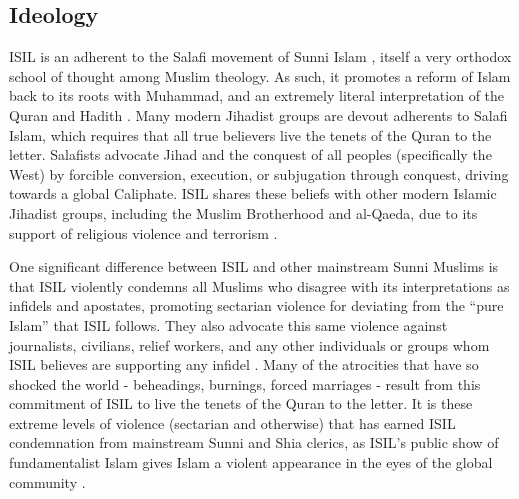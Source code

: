\documentclass{report}
\begin{document}
    


    \subsection{Ideology}
    
    ISIL is an adherent to the Salafi movement of Sunni Islam \cite{Bradley2015}, itself a very orthodox school of thought among Muslim theology.  As such, it promotes a reform of Islam back to its roots with Muhammad, and an extremely literal interpretation of the Quran and Hadith \cite{Hassan2015}. Many modern Jihadist groups are devout adherents to Salafi Islam, which requires that all true believers live the tenets of the Quran to the letter. Salafists  advocate Jihad and the conquest of all peoples (specifically the West) by forcible conversion, execution, or subjugation through conquest, driving towards a global Caliphate. ISIL shares these beliefs with other modern Islamic Jihadist groups, including the Muslim Brotherhood and al-Qaeda, due to its support of religious violence and terrorism \cite{schmidt2004great,gabriel2008they,Hassan2015,Moussalli2009}.
    
    One significant difference between ISIL and other mainstream Sunni Muslims is that ISIL violently condemns all Muslims who disagree with its interpretations as infidels and apostates, promoting  sectarian violence for deviating from the \enquote{pure Islam} that ISIL follows. They also advocate this same violence against journalists, civilians, relief workers, and any other individuals or groups whom ISIL believes are supporting any infidel \cite{Wood2015,Hassan2015,AustralianNationalSecurityAttorney-GeneralsDepartment2014}. Many of the atrocities that have so shocked the world - beheadings, burnings, forced marriages - result from this commitment of ISIL to live the tenets of the Quran to the letter. It is these extreme levels of  violence (sectarian and otherwise) that has earned ISIL condemnation from mainstream Sunni and Shia clerics, as ISIL's public show of fundamentalist Islam gives Islam a violent appearance in the eyes of the global community \cite{Mandhai2014}.
    
\end{document}
